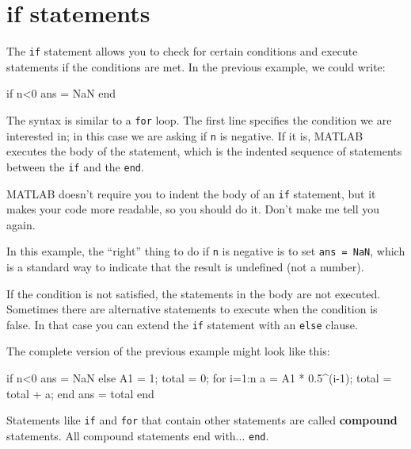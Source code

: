\documentclass[
]{book}
\numberwithin{Answer}{chapter}
\numberwithin{Exercise}{chapter}
\begin{document}
\section{if statements}


The {\tt if} statement allows you to check for certain conditions
and execute statements if the conditions are met.  In the previous
example, we could write:

\begin{code}
if n<0
    ans = NaN
end
\end{code}

The syntax is similar to a {\tt for} loop.  The first line
specifies the condition we are interested in; in this case we
are asking if {\tt n} is negative.  If it is, MATLAB executes
the body of the statement, which is the indented sequence of
statements between the {\tt if} and the {\tt end}.


MATLAB doesn't require you to indent the body of an {\tt if}
statement, but it makes your code more readable, so you should do it.
Don't make me tell you again.

In this example, the ``right'' thing to do if {\tt n} is negative
is to set {\tt ans = NaN}, which is a standard way to indicate that
the result is undefined (not a number).


If the condition is not satisfied, the statements in the body are
not executed.  Sometimes there are alternative statements to
execute when the condition is false.  In that case you can extend
the {\tt if} statement with an {\tt else} clause.


The complete version of the previous example might look like this:

\begin{code}
if n<0
    ans = NaN
else
    A1 = 1;
    total = 0;
    for i=1:n
        a = A1 * 0.5^(i-1);
        total = total + a;
    end
    ans = total
end
\end{code}

Statements like {\tt if} and {\tt for} that contain other statements
are called {\bf compound} statements.  All compound statements end
with... {\tt end}.

\end{document}

